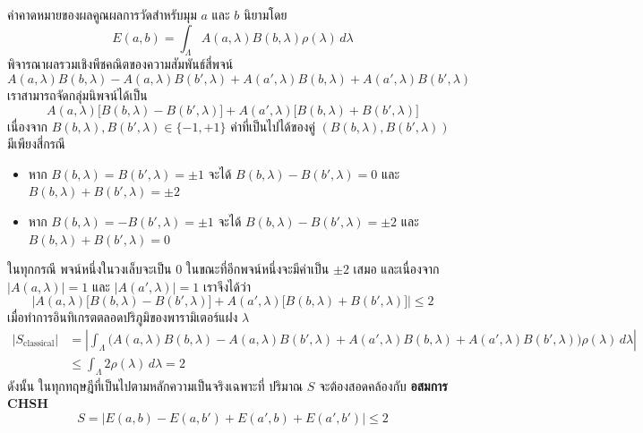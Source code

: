 ค่าคาดหมายของผลคูณผลการวัดสำหรับมุม $a$ และ $b$ นิยามโดย
\begin{equation}
E(a, b) = \int_\Lambda A(a, \lambda) B(b, \lambda) \rho(\lambda) \, d\lambda
\end{equation}
พิจารณาผลรวมเชิงพีชคณิตของความสัมพันธ์สี่พจน์
\begin{equation}
A(a, \lambda) B(b, \lambda) - A(a, \lambda) B(b', \lambda) + A(a', \lambda) B(b, \lambda) + A(a', \lambda) B(b', \lambda)
\end{equation}
เราสามารถจัดกลุ่มนิพจน์ได้เป็น
\begin{equation}
A(a, \lambda) \big[ B(b, \lambda) - B(b', \lambda) \big] + A(a', \lambda) \big[ B(b, \lambda) + B(b', \lambda) \big]
\label{eq:chsh_algebraic_group}
\end{equation}
เนื่องจาก $B(b, \lambda), B(b', \lambda) \in \{-1, +1\}$ ค่าที่เป็นไปได้ของคู่ $(B(b, \lambda), B(b', \lambda))$ มีเพียงสี่กรณี
\begin{itemize}
    \item หาก $B(b, \lambda) = B(b', \lambda) = \pm 1$ จะได้ $B(b, \lambda) - B(b', \lambda) = 0$ และ $B(b, \lambda) + B(b', \lambda) = \pm 2$
    \item หาก $B(b, \lambda) = -B(b', \lambda) = \pm 1$ จะได้ $B(b, \lambda) - B(b', \lambda) = \pm 2$ และ $B(b, \lambda) + B(b', \lambda) = 0$
\end{itemize}
ในทุกกรณี พจน์หนึ่งในวงเล็บจะเป็น $0$ ในขณะที่อีกพจน์หนึ่งจะมีค่าเป็น $\pm 2$ เสมอ และเนื่องจาก $|A(a, \lambda)| = 1$ และ $|A(a', \lambda)| = 1$ เราจึงได้ว่า
\begin{equation}
\Big| A(a, \lambda) \big[ B(b, \lambda) - B(b', \lambda) \big] + A(a', \lambda) \big[ B(b, \lambda) + B(b', \lambda) \big] \Big| \le 2
\end{equation}
เมื่อทำการอินทิเกรตตลอดปริภูมิของพารามิเตอร์แฝง $\lambda$
\begin{align}
|S_{\text{classical}}| &= \left| \int_\Lambda \Big( A(a,\lambda)B(b,\lambda) - A(a,\lambda)B(b',\lambda) + A(a',\lambda)B(b,\lambda) + A(a',\lambda)B(b',\lambda) \Big) \rho(\lambda)\,d\lambda \right| \nonumber \\
&\le \int_\Lambda 2 \rho(\lambda)\,d\lambda = 2
\end{align}
ดังนั้น ในทุกทฤษฎีที่เป็นไปตามหลักความเป็นจริงเฉพาะที่ ปริมาณ $S$ จะต้องสอดคล้องกับ \textbf{อสมการ CHSH}
\begin{equation}
S = |E(a, b) - E(a, b') + E(a', b) + E(a', b')| \le 2
\label{eq:chsh_inequality_classical}
\end{equation}

